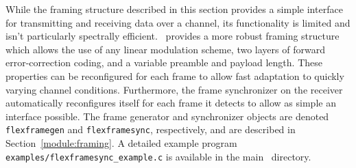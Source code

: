 While the framing structure described in this section provides a simple
interface for transmitting and receiving data over a channel,
its functionality is limited and isn't particularly spectrally
efficient.
\liquid\ provides a more robust framing structure which allows the use
of any linear modulation scheme, two layers of forward error-correction
coding, and a variable preamble and payload length.
These properties can be reconfigured for each frame to allow fast
adaptation to quickly varying channel conditions.
Furthermore, the frame synchronizer on the receiver automatically
reconfigures itself for each frame it detects to allow as simple an
interface possible.
The frame generator and synchronizer objects are denoted
{\tt flexframegen} and
{\tt flexframesync},
respectively,
and are described in Section~\ref{module:framing}.
A detailed example program {\tt examples/flexframesync\_example.c}
is available in the main \liquid\ directory.

